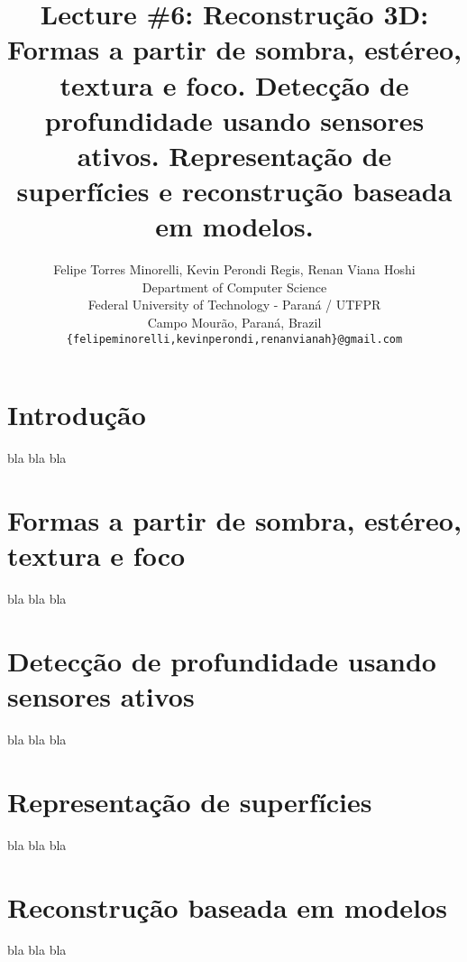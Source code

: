 \documentclass{article}
\title{Lecture \#6: Reconstrução 3D: Formas a partir de sombra, estéreo, textura e foco. Detecção de profundidade usando sensores ativos. Representação de superfícies e reconstrução baseada em modelos.}
\author{
  Felipe Torres Minorelli, Kevin Perondi Regis, Renan Viana Hoshi \\
  Department of Computer Science\\
  Federal University of Technology - Paran\'{a} / UTFPR\\
  Campo Mour\~{a}o, Paran\'{a}, Brazil \\
  \texttt{\{felipeminorelli,kevinperondi,renanvianah\}@gmail.com} \\
}
\begin{document}
\maketitle


\section{Introdução}

bla bla bla

\section{Formas a partir de sombra, estéreo, textura e foco}

bla bla bla

\section{Detecção de profundidade usando sensores ativos}

bla bla bla

\section{Representação de superfícies}

bla bla bla

\section{Reconstrução baseada em modelos}

bla bla bla

\small


\end{document}
